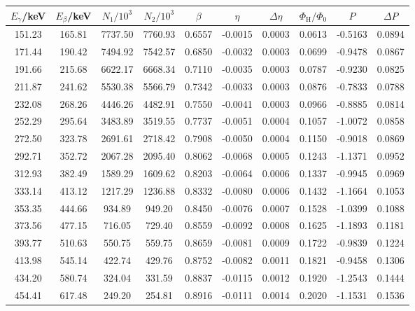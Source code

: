 \documentclass[twoside,colorback,accentcolor=tud4c,11pt]{tudreport}
\begin{document}
\begin{table}[H]
\centering
\begin{tabular}{|c|c|c|c|c|c|c|c|c|c|}
\hline 
$ E_{\gamma} $/keV & $ E_{\beta} $/keV & $ N_1/10^3 $ &$ N_2/10^3 $&$ \beta $ & $ \eta $ & $ \Delta\eta $ & $ \Phi_{\text{H}}/\Phi_{\text{0}} $ & $ P $ & $ \Delta P $ \\
\hline
151.23 & 165.81 & 7737.50 & 7760.93 & 0.6557 & -0.0015 & 0.0003 & 0.0613 & -0.5163 & 0.0894 \\
\hline
171.44 & 190.42 & 7494.92 & 7542.57 & 0.6850 & -0.0032 & 0.0003 & 0.0699 & -0.9478 & 0.0867 \\
\hline
191.66 & 215.68 & 6622.17 & 6668.34 & 0.7110 & -0.0035 & 0.0003 & 0.0787 & -0.9230 & 0.0825 \\
\hline
211.87 & 241.62 & 5530.38 & 5566.79 & 0.7342 & -0.0033 & 0.0003 & 0.0876 & -0.7833 & 0.0788 \\
\hline
232.08 & 268.26 & 4446.26 & 4482.91 & 0.7550 & -0.0041 & 0.0003 & 0.0966 & -0.8885 & 0.0814 \\
\hline
252.29 & 295.64 & 3483.89 & 3519.55 & 0.7737 & -0.0051 & 0.0004 & 0.1057 & -1.0072 & 0.0858 \\
\hline
272.50 & 323.78 & 2691.61 & 2718.42 & 0.7908 & -0.0050 & 0.0004 & 0.1150 & -0.9018 & 0.0869 \\
\hline
292.71 & 352.72 & 2067.28 & 2095.40 & 0.8062 & -0.0068 & 0.0005 & 0.1243 & -1.1371 & 0.0952 \\
\hline
312.93 & 382.49 & 1589.29 & 1609.62 & 0.8203 & -0.0064 & 0.0006 & 0.1337 & -0.9945 & 0.0969 \\
\hline
333.14 & 413.12 & 1217.29 & 1236.88 & 0.8332 & -0.0080 & 0.0006 & 0.1432 & -1.1664 & 0.1053 \\
\hline
353.35 & 444.66 & 934.89 & 949.20 & 0.8450 & -0.0076 & 0.0007 & 0.1528 & -1.0399 & 0.1088 \\
\hline
373.56 & 477.15 & 716.05 & 729.40 & 0.8559 & -0.0092 & 0.0008 & 0.1625 & -1.1893 & 0.1181 \\
\hline
393.77 & 510.63 & 550.75 & 559.75 & 0.8659 & -0.0081 & 0.0009 & 0.1722 & -0.9839 & 0.1224 \\
\hline
413.98 & 545.14 & 422.74 & 429.76 & 0.8752 & -0.0082 & 0.0011 & 0.1821 & -0.9458 & 0.1306 \\
\hline
434.20 & 580.74 & 324.04 & 331.59 & 0.8837 & -0.0115 & 0.0012 & 0.1920 & -1.2543 & 0.1444 \\
\hline
454.41 & 617.48 & 249.20 & 254.81 & 0.8916 & -0.0111 & 0.0014 & 0.2020 & -1.1531 & 0.1536 \\

\end{tabular}
\end{table}
\end{document}
